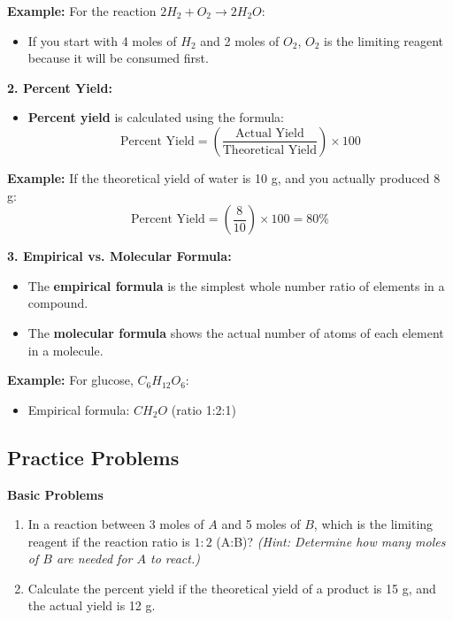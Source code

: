 \documentclass[12pt]{article}
\begin{document}
\textbf{Example:} For the reaction \( 2H_2 + O_2 \rightarrow 2H_2O \):
\begin{itemize}
    \item If you start with 4 moles of \( H_2 \) and 2 moles of \( O_2 \), \( O_2 \) is the limiting reagent because it will be consumed first.
\end{itemize}

\textbf{2. Percent Yield:}
\begin{itemize}
    \item \textbf{Percent yield} is calculated using the formula:
    \[
    \text{Percent Yield} = \left( \frac{\text{Actual Yield}}{\text{Theoretical Yield}} \right) \times 100
    \]
\end{itemize}

\textbf{Example:} If the theoretical yield of water is 10 g, and you actually produced 8 g:
\[
\text{Percent Yield} = \left( \frac{8}{10} \right) \times 100 = 80\%
\]

\textbf{3. Empirical vs. Molecular Formula:}
\begin{itemize}
    \item The \textbf{empirical formula} is the simplest whole number ratio of elements in a compound.
    \item The \textbf{molecular formula} shows the actual number of atoms of each element in a molecule.
\end{itemize}

\textbf{Example:} For glucose, \( C_6H_{12}O_6 \):
\begin{itemize}
    \item Empirical formula: \( CH_2O \) (ratio 1:2:1)
\end{itemize}

\subsection*{Practice Problems}

\textbf{Basic Problems}
\begin{enumerate}[1.]
    \item In a reaction between 3 moles of \( A \) and 5 moles of \( B \), which is the limiting reagent if the reaction ratio is \( 1:2 \) (A:B)? 
    \textit{(Hint: Determine how many moles of \( B \) are needed for \( A \) to react.)}
    
    \item Calculate the percent yield if the theoretical yield of a product is 15 g, and the actual yield is 12 g.
\end{enumerate}
\end{document}
